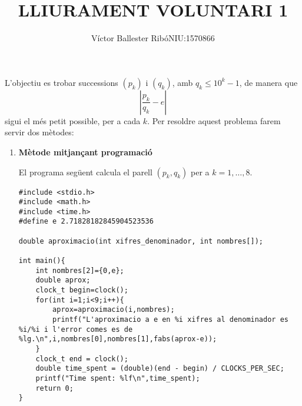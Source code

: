 \documentclass[11pt,a4paper]{article}
\title{\bfseries\large LLIURAMENT VOLUNTARI 1}
\author{Víctor Ballester Ribó\endgraf NIU:1570866}
\date{\parbox{\linewidth}{\centering
  Mètodes numèrics\endgraf
  Grau en Matemàtiques\endgraf
  Universitat Autònoma de Barcelona\endgraf
  Març de 2021}}
\theoremstyle{definition}
\begin{document}
\maketitle
L'objectiu es trobar successions $(p_k)$ i $(q_k)$, amb $q_k\leq10^k-1$, de manera que $$\left|\frac{p_k}{q_k}-e\right|$$ sigui el més petit possible, per a cada $k$. Per resoldre aquest problema farem servir dos mètodes:
\begin{enumerate}
    \item \textbf{Mètode mitjançant programació}\par El programa següent calcula el parell $(p_k,q_k)$ per a $k=1,\ldots,8$.
          \begin{lstlisting}
#include <stdio.h>
#include <math.h>
#include <time.h>
#define e 2.71828182845904523536

double aproximacio(int xifres_denominador, int nombres[]);

int main(){
	int nombres[2]={0,e};
	double aprox;
	clock_t begin=clock();
	for(int i=1;i<9;i++){
		aprox=aproximacio(i,nombres);
		printf("L'aproximacio a e en %i xifres al denominador es %i/%i i l'error comes es de %lg.\n",i,nombres[0],nombres[1],fabs(aprox-e));
	}
	clock_t end = clock();
	double time_spent = (double)(end - begin) / CLOCKS_PER_SEC;
	printf("Time spent: %lf\n",time_spent);
	return 0;
}


\end{lstlisting}
\end{enumerate}
\end{document}
